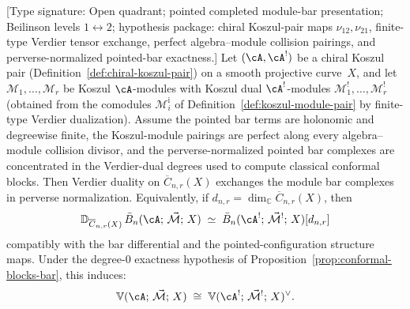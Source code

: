 \begin{theorem}
\label{thm:module-bar-verdier}
\textup{[Type signature: Open quadrant; pointed completed module-bar
presentation; Beilinson levels $1\leftrightarrow2$; hypothesis
package: chiral Koszul-pair maps $\nu_{12},\nu_{21}$, finite-type
Verdier tensor exchange, perfect algebra--module collision pairings,
and perverse-normalized pointed-bar exactness.]}
Let $(\cA, \cA^!)$ be a chiral Koszul pair
\textup{(}Definition~\textup{\ref{def:chiral-koszul-pair}}\textup{)}
on a smooth projective curve~$X$, and let
$\mathcal{M}_1, \ldots, \mathcal{M}_r$ be Koszul
$\cA$-modules with Koszul dual $\cA^!$-modules
$\mathcal{M}_1^!, \ldots, \mathcal{M}_r^!$
\textup{(}obtained from the comodules
$\mathcal{M}_i^{\mathrm{i}}$ of
Definition~\textup{\ref{def:koszul-module-pair}} by finite-type
Verdier dualization\textup{)}. Assume the pointed bar terms are
holonomic and degreewise finite, the Koszul-module pairings are
perfect along every algebra--module collision divisor, and the
perverse-normalized pointed bar complexes are concentrated in the
Verdier-dual degrees used to compute classical conformal blocks.
Then Verdier duality on $\overline{C}_{n,r}(X)$ exchanges the
module bar complexes in perverse normalization. Equivalently, if
$d_{n,r}=\dim_{\mathbb C}\overline{C}_{n,r}(X)$, then
\begin{equation}\label{eq:module-bar-verdier}
\mathbb{D}_{\overline{C}_{n,r}(X)}\,
\bar{B}_n(\cA;\, \vec{\mathcal{M}};\, X)
\;\simeq\;
\bar{B}_n(\cA^!;\, \vec{\mathcal{M}}^!;\, X)[d_{n,r}]
\end{equation}
compatibly with the bar differential and the pointed-configuration
structure maps. Under the degree-$0$ exactness hypothesis of
Proposition~\textup{\ref{prop:conformal-blocks-bar}}, this induces:
\begin{equation}\label{eq:conformal-block-verdier}
\mathbb{V}(\cA;\, \vec{\mathcal{M}};\, X)
\;\cong\;
\mathbb{V}(\cA^!;\, \vec{\mathcal{M}}^!;\, X)^\vee.
\end{equation}
\end{theorem}

